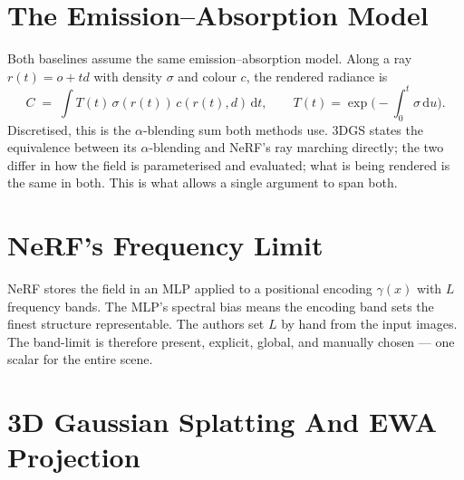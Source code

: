 \section{The Emission--Absorption Model}
Both baselines assume the same emission--absorption model. Along a ray
$r(t)=o+td$ with density $\sigma$ and colour $c$, the rendered radiance is
\begin{equation}
  C \;=\; \int T(t)\,\sigma(r(t))\,c(r(t),d)\,\mathrm{d}t,
  \qquad T(t)=\exp\!\Big(-\!\int_0^t\!\sigma\,\mathrm{d}u\Big).
\end{equation}
Discretised, this is the $\alpha$-blending sum both methods use. 3DGS states the
equivalence between its $\alpha$-blending and NeRF's ray marching directly; the two differ in how the field is parameterised and evaluated; what is being
rendered is the same in both. This is what allows a single argument to span both.

\section{NeRF's Frequency Limit}
NeRF stores the field in an MLP applied to a positional encoding $\gamma(x)$ with
$L$ frequency bands. The MLP's spectral bias means the encoding band sets the
finest structure representable. The authors set $L$ by hand from the input
images. The band-limit is therefore present, explicit, global, and manually
chosen --- one scalar for the entire scene.

\section{3D Gaussian Splatting And EWA Projection}

